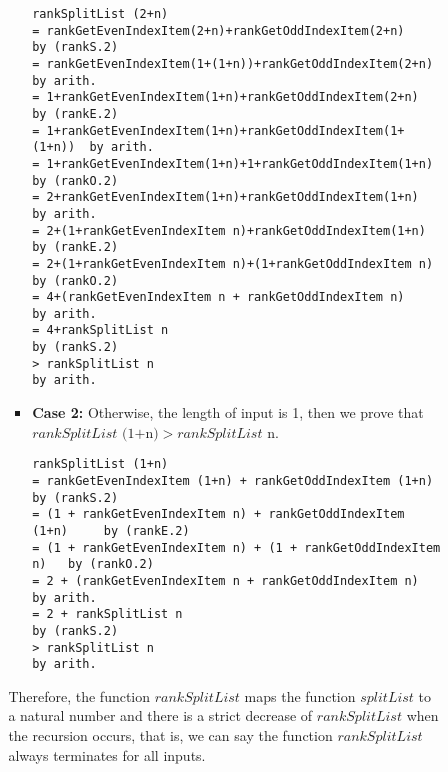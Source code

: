\documentclass[11pt]{article}
\theoremstyle{definition}
\begin{document}
\begin{enumerate}
\begin{enumerate}[(a)]
\begin{enumerate}[i.]
\begin{itemize}
\begin{verbatim}
rankSplitList (2+n)
= rankGetEvenIndexItem(2+n)+rankGetOddIndexItem(2+n)        by (rankS.2)
= rankGetEvenIndexItem(1+(1+n))+rankGetOddIndexItem(2+n)    by arith.
= 1+rankGetEvenIndexItem(1+n)+rankGetOddIndexItem(2+n)      by (rankE.2)
= 1+rankGetEvenIndexItem(1+n)+rankGetOddIndexItem(1+(1+n))  by arith.
= 1+rankGetEvenIndexItem(1+n)+1+rankGetOddIndexItem(1+n)    by (rankO.2)
= 2+rankGetEvenIndexItem(1+n)+rankGetOddIndexItem(1+n)      by arith.
= 2+(1+rankGetEvenIndexItem n)+rankGetOddIndexItem(1+n)     by (rankE.2)
= 2+(1+rankGetEvenIndexItem n)+(1+rankGetOddIndexItem n)    by (rankO.2)
= 4+(rankGetEvenIndexItem n + rankGetOddIndexItem n)        by arith.
= 4+rankSplitList n                                         by (rankS.2)
> rankSplitList n                                           by arith.
\end{verbatim}

\item \textbf{Case 2:} Otherwise, the length of input is 1, then we prove that \\
$rankSplitList \text{ (1+n)} > rankSplitList \text{ n}$.

\begin{verbatim}
rankSplitList (1+n)
= rankGetEvenIndexItem (1+n) + rankGetOddIndexItem (1+n)       by (rankS.2)
= (1 + rankGetEvenIndexItem n) + rankGetOddIndexItem (1+n)     by (rankE.2)
= (1 + rankGetEvenIndexItem n) + (1 + rankGetOddIndexItem n)   by (rankO.2)
= 2 + (rankGetEvenIndexItem n + rankGetOddIndexItem n)         by arith.
= 2 + rankSplitList n                                          by (rankS.2)
> rankSplitList n                                              by arith.
\end{verbatim}
\end{itemize}
Therefore, the function $rankSplitList$ maps the function $splitList$ to a natural number and there is a strict decrease of $rankSplitList$ 
when the recursion occurs, that is, we can say the function $rankSplitList$ always terminates for all inputs.


\end{enumerate}
\end{enumerate}
\end{enumerate}
\end{document}
